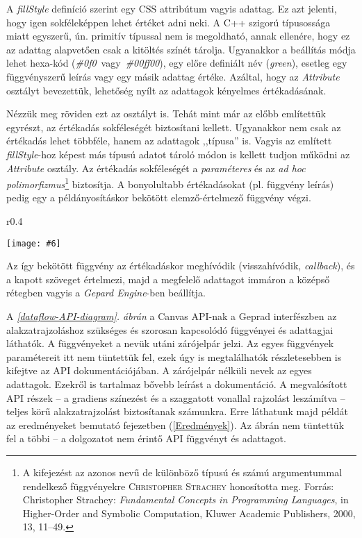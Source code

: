 \documentclass[12pt]{report}
\makeatletter
\theoremstyle{definition}
\newcommand{\inenglish}[1]{\textsl{#1}}
\newcommand{\func}[1]{{\textsl{#1}}}
\newcommand{\melyikoldalra}{r}
\newlength{\Xoffset}
\newlength{\Yoffset}
\newcommand*{\setpdfoffset}[2]{%
  \setlength{\Xoffset}{#1}%
  \setlength{\Yoffset}{#2}%
}
\newcommand*{\setviewport}[4]{%
  \def\x@viewport{%
    {\the\dimexpr#1-\Xoffset}
    {\the\dimexpr#2-\Yoffset}
    {\the\dimexpr#3-\Xoffset}
    {\the\dimexpr#4-\Yoffset}%
  }%
}
\newcommand{\includegraphicskivagas}[6]{
    \setpdfoffset{0pt}{0pt}
    \setviewport{#1}{#2}{#3}{#4}
    \texttt{[image: \#6]}
}
\newcommand{\includedataflowkivagas}[5]{
    \includegraphicskivagas{#1}{#2}{#3}{#4}{scale=0.6,#5}
    {img/built/dataflow_eps}
}
\makeatother
\begin{document}
A \func{fillStyle} definíció szerint egy CSS attribútum vagyis adattag. Ez azt
jelenti, hogy igen sokféleképpen lehet értéket adni neki. A C++ szigorú
típusossága miatt egyszerű, ún. primitív típussal nem is megoldható, annak
ellenére, hogy ez az adattag alapvetően csak a kitöltés színét tárolja.
Ugyanakkor a beállítás módja lehet hexa-kód
(\func{\#0f0}~vagy~\func{\#00ff00}), egy előre definiált név (\func{green}),
esetleg egy függvényszerű leírás vagy egy másik adattag értéke. Azáltal, hogy
az \func{Attribute} osztályt bevezettük, lehetőség nyílt az adattagok kényelmes
értékadásának.

Nézzük meg röviden ezt az osztályt is. Tehát mint már az előbb említettük
egyrészt, az értékadás sokféleségét biztosítani kellett. Ugyanakkor nem csak az
értékadás lehet többféle, hanem az adattagok ,,típusa'' is. Vagyis az említett
\func{fillStyle}-hoz képest más típusú adatot tároló módon is kellett tudjon
működni az \func{Attribute} osztály. Az értékadás sokféleségét a
\emph{paraméteres} és az \emph{ad hoc polimorfizmus}\footnote{ A kifejezést az
azonos nevű de különböző típusú és számú argumentummal rendelkező függvényekre
\textsc{Christopher Strachey} honosította meg. Forrás: Christopher Strachey:
\emph{Fundamental Concepts in Programming Languages}, in Higher-Order and
Symbolic Computation, Kluwer Academic Publishers, 2000, 13, 11–49.} biztosítja.
A bonyolultabb értékadásokat (pl. függvény leírás) pedig egy a példányosításkor
bekötött elemző-értelmező függvény végzi.
  \begin{wrapfigure}{\melyikoldalra}{0.4\textwidth}
    \begin{center}
      \includedataflowkivagas{0pt}{210pt}{160pt}{590pt}{}
    \end{center}
    \caption{\label{dataflow-API-diagram} A \emph{felső} réteg (Gepard
    interfész) függvényei és adattagjai. \\ (Részlet a
    \emph{\ref{dataflow}. folyamatábrából}.)}
  \end{wrapfigure}
Az így bekötött függvény az értékadáskor meghívódik (visszahívódik,
\inenglish{callback}), és a kapott szöveget értelmezi, majd a megfelelő
adattagot immáron a középső rétegben vagyis a \func{Gepard Engine}-ben
beállítja.

A \emph{\ref{dataflow-API-diagram}. ábrán} a Canvas API-nak a Geprad
interfészben az alakzatrajzoláshoz szükséges és szorosan kapcsolódó függvényei
és adattagjai láthatók. A függvényeket a nevük utáni zárójelpár jelzi. Az egyes
függvények paramétereit itt nem tüntettük fel, ezek úgy is megtalálhatók
részletesebben is kifejtve az API dokumentációjában. A zárójelpár nélküli nevek
az egyes adattagok. Ezekről is tartalmaz bővebb leírást a dokumentáció. A
megvalósított API részek -- a gradiens színezést és a szaggatott vonallal
rajzolást leszámítva -- teljes körű alakzatrajzolást biztosítanak számunkra.
Erre láthatunk majd példát az eredményeket bemutató fejezetben
(\ref{Eredmények}). Az ábrán nem tüntettük fel a többi -- a dolgozatot nem
érintő API függvényt és adattagot.
\end{document}
